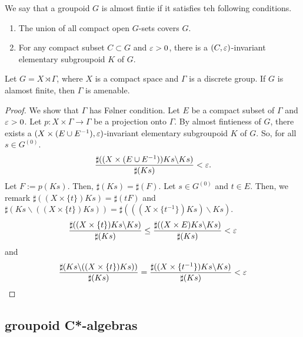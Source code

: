 \begin{definition}
  We say that a groupoid $G$ is almost fintie if it satisfies teh following conditions.
  \begin{enumerate}
  \item The union of all compact open $G$-sets covers $G$.
    \item For any compact subset $C \subset G$ and $\varepsilon > 0$, there is a $(C,\varepsilon)$-invariant elementary subgroupoid $K$ of $G$.
  \end{enumerate}
\end{definition}

\begin{proposition}
  Let $G = X \rtimes \Gamma$, where $X$ is a compact space and $\Gamma$ is a discrete group.
  If $G$ is alamost finite, then $\Gamma$ is amenable. 
\end{proposition}

\begin{proof}
  We show that $\Gamma$ has F{\o}lner condition.
  Let $E$ be a compact subset of $\Gamma$ and $\varepsilon > 0$.
  Let $p:X \times \Gamma \rightarrow \Gamma$ be a projection onto $\Gamma$.
  By almost fintieness of $G$, there exists a $(X\times(E\cup E^{-1}),\varepsilon)$-invariant elementary subgroupoid $K$ of $G$.
  So, for all $s \in G^{(0)}$.
  \begin{align*}
    \frac{\sharp((X \times (E \cup E^{-1}))Ks\backslash Ks)}{\sharp(Ks)} < \varepsilon.
  \end{align*}
  Let $F := p(Ks)$.
  Then, $\sharp(Ks) = \sharp (F)$.
  Let $s \in G^{(0)}$ and $t \in E$.
  Then, we remark $\sharp ((X\times \{t\})Ks) = \sharp (tF)$ and $\sharp(Ks\backslash ((X\times \{t\})Ks)) = \sharp (((X\times \{t^{-1}\})Ks)\backslash Ks)$.
  \begin{align*}
    \frac{\sharp((X\times\{t\})Ks\backslash Ks)}{\sharp (Ks)} \leq\frac{\sharp((X\times E)Ks\backslash Ks)}{\sharp (Ks)} < \varepsilon
  \end{align*}
  and
  \begin{align*}
    \frac{\sharp(Ks\backslash((X\times\{t\})Ks))}{\sharp (Ks)} = \frac{\sharp
      ((X\times \{t^{-1}\})Ks\backslash Ks)}{\sharp (Ks)} < \varepsilon
  \end{align*}
  
  
  
  
\end{proof}

\subsection{groupoid C*-algebras}

